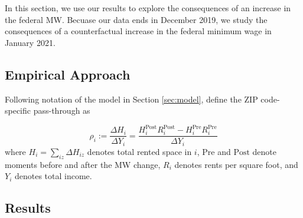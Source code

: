 
In this section, we use our results to explore the consequences of an increase
in the federal MW.
Becuase our data ends in December 2019, we study the consequences of a 
counterfactual increase in the federal minimum wage in January 2021.




\subsection{Empirical Approach}

Following notation of the model in Section \ref{sec:model}, define the ZIP code-
specific pass-through as

\begin{equation}\label{eq:pass_through}
    \rho_i := \frac{\Delta H_i}{\Delta Y_i} 
            = \frac{H^{\text{Post}}_i R^{\text{Post}}_i - H^{\text{Pre}}_i R^{\text{Pre}}_i}{\Delta Y_i}
\end{equation}
where $H_i = \sum_{iz}\Delta H_{iz}$ denotes total rented space in $i$, 
$\text{Pre}$ and $\text{Post}$ denote moments before and after the MW change,
$R_i$ denotes rents per square foot, and 
$Y_i$ denotes total income.



\subsection{Results}


